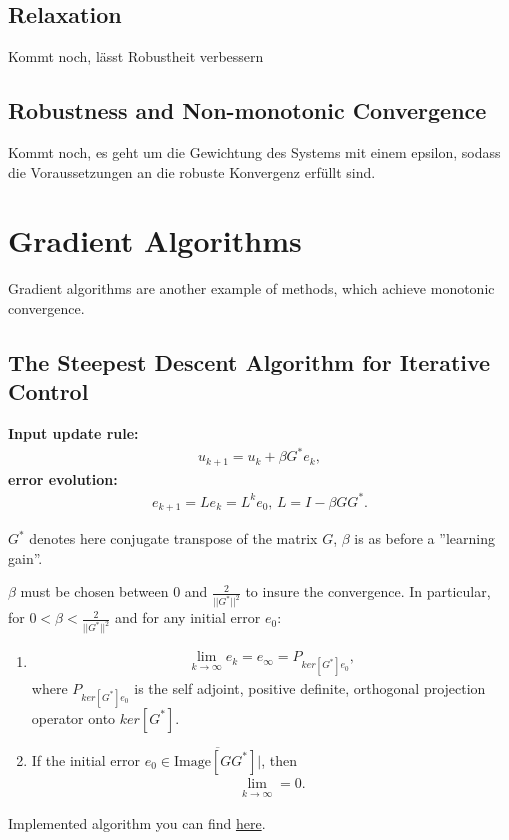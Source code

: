 \documentclass[12pt,ngerman]{article}
\begin{document}
\subsection{Relaxation}
Kommt noch, lässt Robustheit verbessern 
\subsection{Robustness and Non-monotonic Convergence} 
Kommt noch, es geht um die Gewichtung des Systems mit einem epsilon, sodass die Voraussetzungen an die robuste Konvergenz erfüllt sind. 


\section{Gradient Algorithms}
Gradient algorithms are another example of methods, which achieve monotonic convergence. 

\subsection{The Steepest Descent Algorithm for Iterative Control}
\textbf{Input update rule: }
\begin{align}
u_{k+1} = u_k + \beta G^* e_k,
\end{align}
\textbf{error evolution:}
\begin{align}
e_{k+1} = L e_k = L^k e_0, \, L = I - \beta G G^*.
\end{align}

$G^*$ denotes here conjugate transpose of the matrix $G$, $\beta$ is as before a ''learning gain''. 

$\beta$ must be chosen between 0 and $\frac{2}{||G^*||^2}$ to insure the convergence. 
In particular, for $0<\beta<\frac{2}{||G^*||^2} $ and for any initial error $e_0$: 

\begin{enumerate}
	\item \begin{align}
	\lim_{k \to \infty} e_k = e_\infty = P_{ker[G^*]e_0},
	\end{align}\label{eq: eInf}
	 where $P_{ker[G^*]e_0}$ is the self adjoint, positive definite, orthogonal projection operator onto $ker[G^*]$. 
	\item If the initial error $e_0 \in \overline{\text{Image}[GG^*]|}$, then 
	\begin{align}
	\lim_{k \to \infty} = 0.
	\end{align}
\end{enumerate}
Implemented algorithm you can find \href{run ./MATLAB/SDA.m}{here}. 
\end{document}
